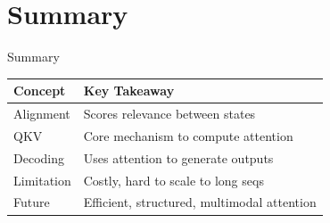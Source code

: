 \section{Summary}
\begin{frame}{Summary}
  \begin{table}[]
    \centering
    \begin{tabular}{@{}ll@{}}
      \toprule
      \textbf{Concept}   & \textbf{Key Takeaway}                                    \\ \midrule
      Alignment   & Scores relevance between states            \\
      QKV         & Core mechanism to compute attention        \\
      Decoding    & Uses attention to generate outputs         \\
      Limitation  & Costly, hard to scale to long seqs         \\
      Future      & Efficient, structured, multimodal attention \\
      \bottomrule
    \end{tabular}
  \end{table}
\end{frame}
